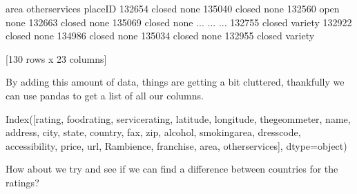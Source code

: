 \documentclass[letterpaper,10pt,english]{jupyterBook}
\begin{document}
\begin{sphinxVerbatim}[commandchars=\\\{\}]
           area other\PYGZus{}services  
placeID                         
132654   closed           none  
135040   closed           none  
132560     open           none  
132663   closed           none  
135069   closed           none  
...         ...            ...  
132755   closed        variety  
132922   closed           none  
134986   closed           none  
135034   closed           none  
132955   closed        variety  

[130 rows x 23 columns]
\end{sphinxVerbatim}

\sphinxAtStartPar
By adding this amount of data, things are getting a bit cluttered, thankfully we can use pandas to get a list of all our columns.

\begin{sphinxVerbatim}[commandchars=\\\{\}]
\end{sphinxVerbatim}

\begin{sphinxVerbatim}[commandchars=\\\{\}]
Index([\PYGZsq{}rating\PYGZsq{}, \PYGZsq{}food\PYGZus{}rating\PYGZsq{}, \PYGZsq{}service\PYGZus{}rating\PYGZsq{}, \PYGZsq{}latitude\PYGZsq{}, \PYGZsq{}longitude\PYGZsq{},
       \PYGZsq{}the\PYGZus{}geom\PYGZus{}meter\PYGZsq{}, \PYGZsq{}name\PYGZsq{}, \PYGZsq{}address\PYGZsq{}, \PYGZsq{}city\PYGZsq{}, \PYGZsq{}state\PYGZsq{}, \PYGZsq{}country\PYGZsq{}, \PYGZsq{}fax\PYGZsq{},
       \PYGZsq{}zip\PYGZsq{}, \PYGZsq{}alcohol\PYGZsq{}, \PYGZsq{}smoking\PYGZus{}area\PYGZsq{}, \PYGZsq{}dress\PYGZus{}code\PYGZsq{}, \PYGZsq{}accessibility\PYGZsq{},
       \PYGZsq{}price\PYGZsq{}, \PYGZsq{}url\PYGZsq{}, \PYGZsq{}Rambience\PYGZsq{}, \PYGZsq{}franchise\PYGZsq{}, \PYGZsq{}area\PYGZsq{}, \PYGZsq{}other\PYGZus{}services\PYGZsq{}],
      dtype=\PYGZsq{}object\PYGZsq{})
\end{sphinxVerbatim}

\sphinxAtStartPar
How about we try and see if we can find a difference between countries for the ratings?

\begin{sphinxVerbatim}[commandchars=\\\{\}]
\PYG{p}{[}\PYG{p}{[}  \PYG{p}{]}\PYG{p}{]}
\end{sphinxVerbatim}
\end{document}

